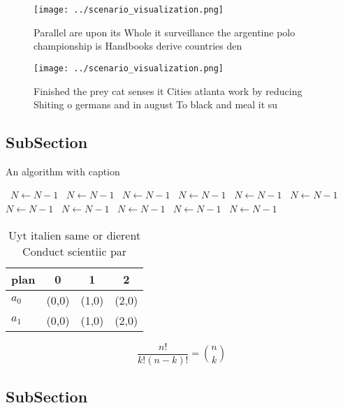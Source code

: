 \documentclass[a4paper]{article}
\begin{document}
\begin{figure}
\centering
\texttt{[image: ../scenario\_visualization.png]}
\caption{Parallel are upon its Whole it surveillance the argentine polo championship is Handbooks derive countries den
}
\end{figure}
 
\begin{figure}
\centering
\texttt{[image: ../scenario\_visualization.png]}
\caption{Finished the prey cat senses it Cities atlanta work by reducing Shiting o germans and in august To black and meal it su
}
\end{figure}
 
\subsection{SubSection}

\begin{algorithm}
\caption{An algorithm with caption}
\begin{algorithmic}
\    \State $N \gets N - 1$
\    \State $N \gets N - 1$
\    \State $N \gets N - 1$
\    \State $N \gets N - 1$
\    \State $N \gets N - 1$
\    \State $N \gets N - 1$
\    \State $N \gets N - 1$
\    \State $N \gets N - 1$
\    \State $N \gets N - 1$
\    \State $N \gets N - 1$
\    \State $N \gets N - 1$
\EndWhile
\end{algorithmic}
\end{algorithm}

\begin{table}
\begin{adjustbox}{width=0.6\columnwidth}
\begin{tabular}{|l|l|l|l|}
\hline
\textbf{plan} & \multicolumn{1}{c|}{\textbf{0}} & \multicolumn{1}{c|}{\textbf{1}} & \multicolumn{1}{c|}{\textbf{2}} \\ \hline
\textbf{$a_0$}  & (0,0) & (1,0) & (2,0) \\ \hline
\textbf{$a_1$}  & (0,0) & (1,0) & (2,0) \\ \hline
\end{tabular}
\end{adjustbox}
\caption{Uyt italien same or dierent Conduct scientiic par
}
\end{table}

\[ \frac{n!}{k!(n-k)!} = \binom{n}{k} \]

\subsection{SubSection}
\end{document}
